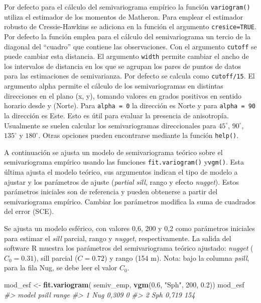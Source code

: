 \documentclass[11pt,b5paper,]{krantz}
\newenvironment{Shaded}{}{}
\newcommand{\KeywordTok}[1]{\textcolor[rgb]{0.00,0.44,0.13}{\textbf{#1}}}
\newcommand{\DecValTok}[1]{\textcolor[rgb]{0.25,0.63,0.44}{#1}}
\newcommand{\FloatTok}[1]{\textcolor[rgb]{0.25,0.63,0.44}{#1}}
\newcommand{\StringTok}[1]{\textcolor[rgb]{0.25,0.44,0.63}{#1}}
\newcommand{\CommentTok}[1]{\textcolor[rgb]{0.38,0.63,0.69}{\textit{#1}}}
\newcommand{\NormalTok}[1]{#1}
\begin{document}
Por defecto para el cálculo del semivariograma empírico la función
\texttt{variogram()} utiliza el estimador de los momentos de Matheron.
Para emplear el estimador robusto de Cressie-Hawkins se adiciona en la
función el argumento \texttt{cresice=TRUE}. Por defecto la función
emplea para el cálculo del semivariograma un tercio de la diagonal del
``cuadro'' que contiene las observaciones. Con el argumento
\texttt{cutoff} se puede cambiar esta distancia. El argumento
\texttt{width} permite cambiar el ancho de los intervalos de distancia
en los que se agrupan los pares de puntos de datos para las estimaciones
de semivarianza. Por defecto se calcula como \texttt{cutoff/15}. El
argumento alpha permite el cálculo de los semivariogramas en distintas
direcciones en el plano (x, y), tomando valores en grados positivos en
sentido horario desde y (Norte). Para \texttt{alpha\ =\ 0} la dirección
es Norte y para \texttt{alpha\ =\ 90} la dirección es Este. Esto es útil
para evaluar la presencia de anisotropía. Usualmente se suelen calcular
los semivariogramas direccionales para \(45^\circ\), \(90^\circ\),
\(135^\circ\) y \(180^\circ\). Otras opciones pueden encontrarse
mediante la función \texttt{help()}.

A continuación se ajusta un modelo de semivariograma teórico sobre el
semivariograma empírico usando las funciones \texttt{fit.variogram()}
y\texttt{vgm()}. Esta última ajusta el modelo teórico, sus argumentos
indican el tipo de modelo a ajustar y los parámetros de ajuste
(\emph{partial sill}, rango y efecto \emph{nugget}). Estos parámetros
iniciales son de referencia y pueden obtenerse a partir del
semivariograma empírico. Cambiar los parámetros modifica la suma de
cuadrados del error (SCE).

Se ajusta un modelo esférico, con valores 0,6, 200 y 0,2 como parámetros
iniciales para estimar el \emph{sill} parcial, rango y \emph{nugget},
respectivamente. La salida del software R muestra los parámetros del
semivariograma teórico ajustado: \emph{nugget} (\(C_0=0.31\)), sill
parcial (\(C=0.72\)) y rango (154 m). Nota: bajo la columna
\emph{psill}, para la fila Nug, se debe leer el valor \(C_0\).

\begin{Shaded}
\begin{Highlighting}[]
\NormalTok{mod_esf <-}\StringTok{ }\KeywordTok{fit.variogram}\NormalTok{(}
\NormalTok{  semiv_emp,}
  \KeywordTok{vgm}\NormalTok{(}\FloatTok{0.6}\NormalTok{, }\StringTok{"Sph"}\NormalTok{, }\DecValTok{200}\NormalTok{, }\FloatTok{0.2}\NormalTok{))}
\NormalTok{mod_esf}
\CommentTok{#>   model psill range}
\CommentTok{#> 1   Nug 0,309     0}
\CommentTok{#> 2   Sph 0,719   154}
\end{Highlighting}
\end{Shaded}
\end{document}
